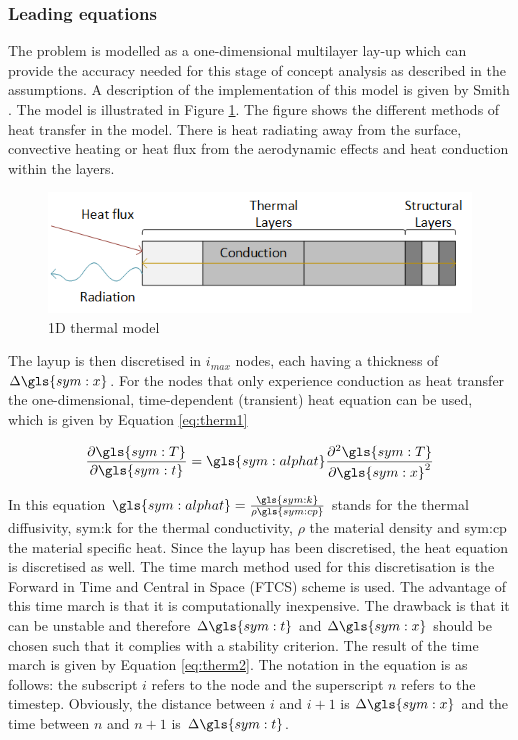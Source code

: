 \subsubsection{Leading equations}
The problem is modelled as a one-dimensional multilayer lay-up which can provide the accuracy needed for this stage of concept analysis as described in the assumptions. A description of the implementation of this model is given by Smith \cite{Smith2011}. The model is illustrated in Figure \ref{fig:1dthermal}. The figure shows the different methods of heat transfer in the model. There is heat radiating away from the surface, convective heating or heat flux from the aerodynamic effects and heat conduction within the layers.

\begin{figure}[H]
	\centering
	\includegraphics{Figure/1dthermal.png}
	\caption{1D thermal model}
	\label{fig:1dthermal}
\end{figure}

The layup is then discretised in $i_{max}$ nodes, each having a thickness of $\Delta \gls{sym:x}$. For the nodes that only experience conduction as heat transfer the one-dimensional, time-dependent (transient) heat equation can be used, which is given by Equation \eqref{eq:therm1}

\begin{equation}
\frac{\partial \gls{sym:T}}{\partial \gls{sym:t}} = \gls{sym:alphat}\frac{\partial^2\gls{sym:T}}{\partial \gls{sym:x}^2}
\label{eq:therm1}
\end{equation}

In this equation $\gls{sym:alphat}=\frac{\gls{sym:k}}{\rho \gls{sym:cp}}$ stands for the thermal diffusivity, \gls{sym:k} for the thermal conductivity, $\rho$ the material density and \gls{sym:cp} the material specific heat. Since the layup has been discretised, the heat equation is discretised as well. The time march method used for this discretisation is the Forward in Time and Central in Space (FTCS) scheme is used. The advantage of this time march is that it is computationally inexpensive. The drawback is that it can be unstable and therefore $\Delta \gls{sym:t}$ and $\Delta \gls{sym:x}$ should be chosen such that it complies with a stability criterion. The result of the time march is given by Equation \eqref{eq:therm2}. The notation in the equation is as follows: the subscript $i$ refers to the node and the superscript $n$ refers to the timestep. Obviously, the distance between $i$ and $i+1$ is $\Delta \gls{sym:x}$ and the time between $n$ and $n+1$ is $\Delta \gls{sym:t}$.

